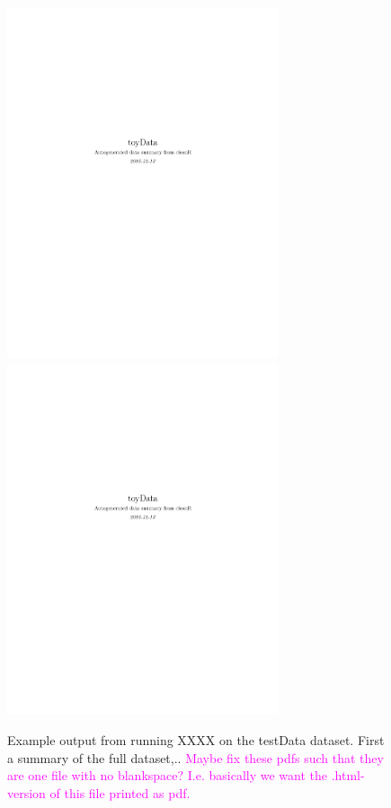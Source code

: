 \documentclass[article]{jss}
\newcommand{\hl}[1]{\textcolor{magenta}{#1}}
\begin{document}
\begin{figure}[!htp]
\begin{center}
\includegraphics[width=8cm,page=2]{cleanR_toyData.pdf} 
\includegraphics[width=8cm, page=3]{cleanR_toyData.pdf} 
%

\end{center}
\label{fig:example1}
\caption{Example output from running XXXX on the testData
  dataset. First a summary of the full dataset,.. 
  \hl{Maybe fix these pdfs such that they are one file with no blankspace? I.e. basically we want the .html-version of this file printed as pdf.}}
\end{figure}
\end{document}
